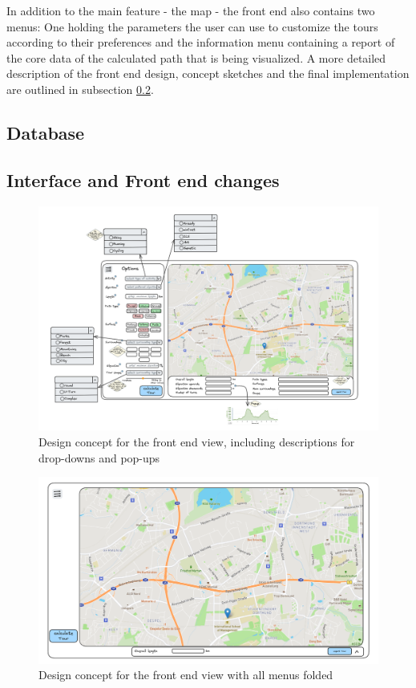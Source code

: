 In addition to the main feature - the map - the front end also contains two menus:
One holding the parameters the user can use to customize the tours according to their preferences and the information menu containing a report of the core data of the calculated path that is being visualized. 
A more detailed description of the front end design, concept sketches and the final implementation are outlined in subsection \ref{subsec:interfaceAndFrontendChanges}.

\subsection{Database}
\label{subsection:database}

\subsection{Interface and Front end changes}
\label{subsec:interfaceAndFrontendChanges}

\begin{figure}[H]
	\includegraphics[width=0.9\linewidth]{bilder/Concept new Frontend design.png}
	\caption{Design concept for the front end view, including descriptions for drop-downs and pop-ups}
	\label{fig:frontendConcept}
\end{figure}


\begin{figure}[H]
	\includegraphics[width=0.9\linewidth]{bilder/Concept burger menu and stats hidden.png}
	\caption{Design concept for the front end view with all menus folded}
	\label{fig:frontendConceptMenusClosed}
\end{figure}


